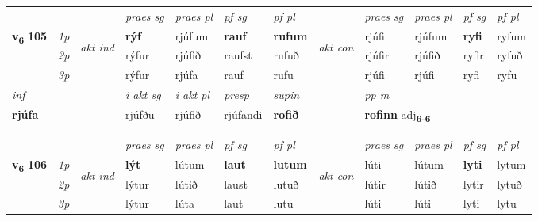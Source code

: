 \begin{longtable}[l]{X>{\footnotesize\itshape}llXXXXlXXXX}
\midrule

 & &   & \textit{praes sg}  & \textit{praes pl}    & \textit{ pf sg} & \textit{pf pl} & & \textit{praes sg}  & \textit{praes pl}    & \textit{pf sg} & \textit{pf pl }  \\ \cmidrule{4-7} \cmidrule{9-12}
 \multirow{2}{*}{{{\textbf{v{\textsubscript{6}}} \Large{\textbf{105}}}}}  & 1p & \multirow{3}{*}{\begin{turn}{90}\textit{akt ind}\end{turn}} & \textbf{rýf} & rjúfum & \textbf{rauf} & \textbf{rufum} & \multirow{3}{*}{\begin{turn}{90}\textit{akt con}\end{turn}} &rjúfi & rjúfum & \textbf{ryfi} & ryfum\\*
 & 2p &  &  rýfur  & rjúfið & raufst & rufuð & & rjúfir & rjúfið & ryfir & ryfuð \\*
 & 3p &  & rýfur & rjúfa & rauf & rufu & & rjúfi & rjúfi& ryfi & ryfu \\*
\cmidrule{4-7} \cmidrule{9-12}

   {\textit{inf}} & &  & \textit{i akt sg} & \textit{i akt pl}   & \textit{presp} & \textit{supin}  && \textit{pp m} \\*
  {\textbf{rjúfa}} & && rjúfðu  & rjúfið   & rjúfandi &  \textbf{rofið}  && \multicolumn{2}{l}{\textbf{rofinn} adj\textbf{\textsubscript{6-6}}} \\*

\midrule

   & \\*
  & \\
   \midrule
 & &   & \textit{praes sg}  & \textit{praes pl}    & \textit{ pf sg} & \textit{pf pl} & & \textit{praes sg}  & \textit{praes pl}    & \textit{pf sg} & \textit{pf pl }  \\ \cmidrule{4-7} \cmidrule{9-12}
 \multirow{2}{*}{{{\textbf{v{\textsubscript{6}}} \Large{\textbf{106}}}}}  & 1p & \multirow{3}{*}{\begin{turn}{90}\textit{akt ind}\end{turn}} & \textbf{lýt} & lútum & \textbf{laut} & \textbf{lutum} & \multirow{3}{*}{\begin{turn}{90}\textit{akt con}\end{turn}} &lúti & lútum & \textbf{lyti} & lytum\\*
 & 2p &  &  lýtur  & lútið & laust & lutuð & & lútir & lútið & lytir & lytuð \\*
 & 3p &  & lýtur & lúta & laut & lutu & & lúti & lúti& lyti & lytu \\*
\cmidrule{4-7} \cmidrule{9-12}


\end{longtable}
